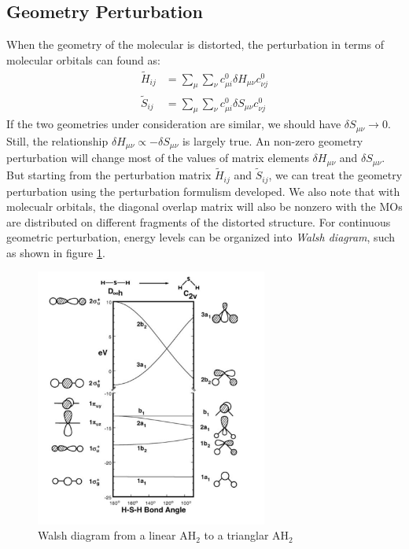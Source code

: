 \documentclass{article}
\begin{document}
\subsection{Geometry Perturbation}
When the geometry of the molecular is distorted, the perturbation in terms of molecular orbitals can found as:
\begin{align}
    \tilde{H}_{ij} &= \sum_{\mu}\sum_{\nu} c_{\mu i}^0 \delta H_{\mu \nu} c_{\nu j}^0 \\ 
    \tilde{S}_{ij} &= \sum_{\mu}\sum_{\nu} c_{\mu i}^0 \delta S_{\mu \nu} c_{\nu j}^0 
\end{align} 
If the two geometries under consideration are similar, we should have $\delta S_{\mu \nu} \to 0$. Still, the relationship
$\delta H_{\mu \nu} \propto - \delta S_{\mu \nu}$ is largely true. An non-zero geometry perturbation will change most 
of the values of matrix elements $\delta H_{\mu \nu}$ and $\delta S_{\mu \nu}$. But starting from the perturbation 
matrix $\tilde{H}_{ij}$ and $\tilde{S}_{ij}$, we can treat the geometry perturbation using the perturbation formulism 
developed. We also note that with molecualr orbitals, the diagonal overlap matrix will also be nonzero with the 
MOs are distributed on different fragments of the distorted structure. For continuous geometric perturbation, energy 
levels can be organized into \emph{Walsh diagram}, such as shown in figure \ref{F:walsh_diagram}.
\begin{figure}[h!]
    \centering
    \includegraphics[width=3in]{F_walsh_diagram.png}
    \caption{Walsh diagram from a linear AH$_2$ to a trianglar AH$_2$}
    \label{F:walsh_diagram}
\end{figure}
\end{document}
